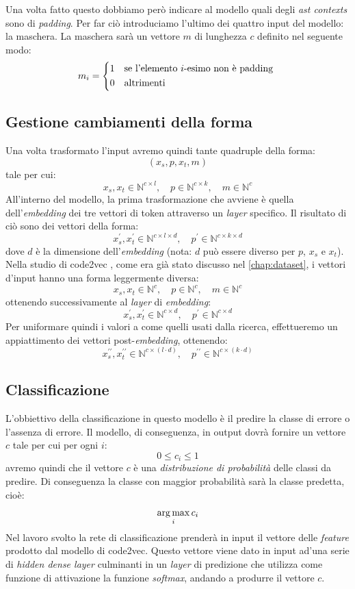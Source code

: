 Una volta fatto questo dobbiamo però indicare al modello quali degli \textit{ast contexts} sono di \textit{padding}. 
Per far ciò introduciamo l'ultimo dei quattro input del modello: la maschera.
La maschera sarà un vettore $m$ di lunghezza $c$ definito nel seguente modo:
    \begin{align*}
        m_i =
        \begin{cases*}
        1 & se l'elemento $i$-esimo non è padding \\
        0 & altrimenti
        \end{cases*}
    \end{align*}

\subsection{Gestione cambiamenti della forma}\label{subsec:cambiamenti_forma}
Una volta trasformato l'input avremo quindi tante quadruple della forma:
    \[(x_s, p, x_t, m)\]
tale per cui:
\[x_s, x_t \in \mathbb{N}^{c \times l}, \quad p \in \mathbb{N}^{c \times k}, \quad m \in  \mathbb{N}^{c}\]
All'interno del modello, la prima trasformazione che avviene è quella dell'\textit{embedding} dei tre vettori di token attraverso un \textit{layer} specifico.
Il risultato di ciò sono dei vettori della forma:
    \[x_s^{\prime}, x_t^{\prime} \in \mathbb{N}^{c \times l \times d}, \quad p^{\prime} \in \mathbb{N}^{c \times k \times d}\]
dove $d$ è la dimensione dell'\textit{embedding} (nota: $d$ può essere diverso per $p$, $x_s$ e $x_t$).
Nella studio di code2vec \cite{alon2019code2vec}, come era già stato discusso nel \autoref{chap:dataset}, i vettori d'input hanno una forma leggermente diversa:
\[x_s, x_t \in \mathbb{N}^{c}, \quad p \in \mathbb{N}^{c}, \quad m \in  \mathbb{N}^{c}\]
ottenendo successivamente al \textit{layer} di \textit{embedding}:
\[x_s^{\prime}, x_t^{\prime} \in \mathbb{N}^{c \times d}, \quad p^{\prime} \in \mathbb{N}^{c \times d}\]
Per uniformare quindi i valori a come quelli usati dalla ricerca, effettueremo un appiattimento dei vettori post-\textit{embedding}, ottenendo:
\[x_s^{\prime\prime}, x_t^{\prime\prime} \in \mathbb{N}^{c \times (l \cdot d)}, \quad p^{\prime\prime} \in \mathbb{N}^{c \times (k \cdot d)}\]


\subsection{Classificazione}
L'obbiettivo della classificazione in questo modello è il predire la classe di errore o l'assenza di errore. 
Il modello, di conseguenza, in output dovrà fornire un vettore $c$ tale per cui per ogni $i$:
\[0 \leq c_i \leq 1\]
avremo quindi che il vettore $c$ è una \textit{distribuzione di probabilità} delle classi da predire.
Di conseguenza la classe con maggior probabilità sarà la classe predetta, cioè:
    \[\operatorname*{arg\,max}_i c_i\]
Nel lavoro svolto la rete di classificazione prenderà in input il vettore delle \textit{feature} prodotto dal modello di code2vec.
Questo vettore viene dato in input ad'una serie di \textit{hidden dense layer} culminanti in un \textit{layer} di predizione che utilizza come funzione di attivazione la funzione \textit{softmax}, andando a produrre il vettore $c$.

